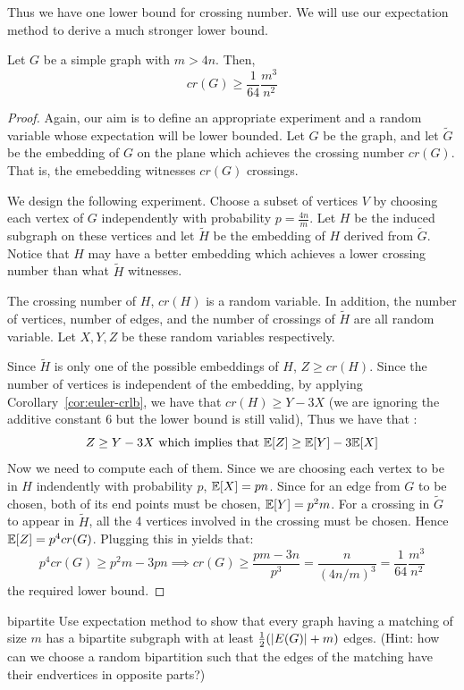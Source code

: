 Thus we have one lower bound for crossing number. We will use our expectation method to derive a much stronger lower bound.

\begin{theorem}
Let $G$ be a simple graph with $m > 4n$. Then,
$$cr(G) \ge \frac{1}{64}\frac{m^3}{n^2}$$
\end{theorem}
\begin{proof}
Again, our aim is to define an appropriate experiment and a random variable whose expectation will be lower bounded. Let $G$ be the graph, and let $\tilde{G}$ be the embedding of $G$ on the plane which achieves the crossing number $cr(G)$. That is, the emebedding witnesses $cr(G)$ crossings.

We design the following experiment. Choose a subset of vertices $V$ by choosing each vertex of $G$ independently with probability $p = \frac{4n}{m}$. Let $H$ be the induced subgraph on these vertices and let $\tilde{H}$ be the embedding of $H$ derived from $\tilde{G}$. Notice that $H$ may have a better embedding which achieves a lower crossing number than what $\tilde{H}$ witnesses.

The crossing number of $H$, $cr(H)$ is a random variable. In addition, the number of vertices, number of edges, and the number of crossings of $\tilde{H}$ are all random variable. Let $X,Y,Z$ be these random variables respectively. 

Since $\tilde{H}$ is only one of the possible embeddings of $H$, $Z \ge cr(H)$. Since the number of vertices is independent of the embedding, by applying Corollary~\ref{cor:euler-crlb}, we have that $cr(H) \ge Y-3X$ (we are ignoring the additive constant 6 but the lower bound is still valid), Thus we have that :
$$Z \ge Y-3X \textrm{ which implies that } {\mathbb E}[Z] \ge {\mathbb E}[Y]-3{\mathbb E}[X]$$
Now we need to compute each of them. Since we are choosing each vertex to be in $H$ indendently with probability $p$, ${\mathbb E}[X] = pn$. Since for an edge from $G$ to be chosen, both of its end points must be chosen, ${\mathbb E}[Y] = p^2m$. For a crossing in $\tilde{G}$ to appear in $\tilde{H}$, all the 4 vertices involved in the crossing must be chosen. Hence ${\mathbb E}[Z] = p^4cr(G)$. Plugging this in yields that:
$$p^4cr(G) \ge p^2m - 3pn \implies cr(G) \ge \frac{pm-3n}{p^3} = \frac{n}{(4n/m)^3} = \frac{1}{64}\frac{m^3}{n^2}$$ the required lower bound.
\end{proof}

\begin{exercise-prob}
\begin{show-ps2}{bipartite}
Use expectation method to show that every graph having a matching of size $m$ has a bipartite subgraph with at least $\frac{1}{2}(|E(G)|+m)$ edges. (Hint: how can we choose a random bipartition such that the edges of the matching have their endvertices in opposite parts?)
\end{show-ps2}
\end{exercise-prob}

